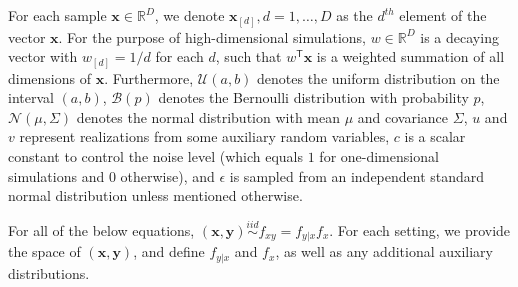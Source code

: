 \documentclass[11pt]{article}
\providecommand{\mb}[1]{\boldsymbol{#1}}
\providecommand{\mc}[1]{\mathcal{#1}}
\newcommand{\Real}{\mathbb{R}}
\newcommand{\T}{^{\ensuremath{\mathsf{T}}}}           %
\newcommand{\mbx}{\ensuremath{\mb{x}}}
\begin{document}
For each sample $\mb{x} \in \Real^{D}$, we denote $\mb{x}_{[d]}, d=1,\ldots,D$ as the $d^{th}$ element of the vector  \mbx. For the purpose of high-dimensional simulations, $w \in \Real^{D}$ is a decaying vector with $w_{[d]}=1/d$ for each $d$, such that $w\T \mb{x}$ is a 
weighted summation of all dimensions of \mbx. %
Furthermore, $\mc{U}(a,b)$ denotes the uniform distribution on the interval $(a,b)$, $\mc{B}(p)$ denotes the Bernoulli distribution with probability $p$, $\mc{N}(\mu,{\Sigma})$ denotes the normal distribution with mean ${\mu}$ and covariance ${\Sigma}$, 
$u$ and $v$ represent realizations from some auxiliary random variables, $c$ is a scalar constant to control the noise level (which equals $1$ for one-dimensional simulations and $0$ otherwise), and $\epsilon$ is sampled from an independent standard normal distribution unless mentioned otherwise.

For all of the below equations, $(\mb{x},\mb{y}) \overset{iid}{\sim} f_{xy} = f_{y|x} f_x$. For each setting, we provide the space of $(\mb{x},\mb{y})$, and define $f_{y|x}$ and $f_x$, as well as any additional auxiliary distributions.
\end{document}
